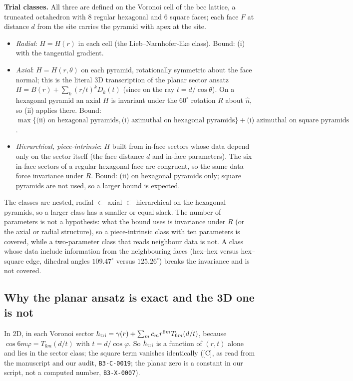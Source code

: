 \documentclass[10pt]{article}
\newcommand{\tier}[1]{\textsf{[#1]}}
\newcommand{\cid}[1]{\texttt{B3-#1}}
\theoremstyle{remark}
\begin{document}
\textbf{Trial classes.} All three are defined on the Voronoi cell of the bcc lattice, a truncated octahedron with 8 regular hexagonal and 6 square faces; each face $F$ at distance $d$ from the site carries the pyramid with apex at the site.
\begin{itemize}
\item \emph{Radial}: $H=H(r)$ in each cell (the Lieb--Narnhofer-like class). Bound: (i) with the tangential gradient.
\item \emph{Axial}: $H=H(r,\theta)$ on each pyramid, rotationally symmetric about the face normal; this is the literal 3D transcription of the planar sector ansatz $H=B(r)+\sum_k(r/t)^kD_k(t)$ (since on the ray $t=d/\cos\theta$). On a hexagonal pyramid an axial $H$ is invariant under the $60^\circ$ rotation $R$ about $\hat n$, so (ii) applies there. Bound: $\max\{\text{(ii) on hexagonal pyramids},\text{(i) azimuthal on hexagonal pyramids}\}+\text{(i) azimuthal on square pyramids}$.
\item \emph{Hierarchical, piece-intrinsic}: $H$ built from in-face sectors whose data depend only on the sector itself (the face distance $d$ and in-face parameters). The six in-face sectors of a regular hexagonal face are congruent, so the same data force invariance under $R$. Bound: (ii) on hexagonal pyramids only; square pyramids are not used, so a larger bound is expected.
\end{itemize}
The classes are nested, radial $\subset$ axial $\subset$ hierarchical on the hexagonal pyramids, so a larger class has a smaller or equal slack.
The number of parameters is not a hypothesis: what the bound uses is invariance under $R$ (or the axial or radial structure), so a piece-intrinsic class with ten parameters is covered, while a two-parameter class that reads neighbour data is not. A class whose data
include information from the neighbouring faces (hex--hex versus hex--square edge, dihedral angles $109.47^\circ$ versus $125.26^\circ$) breaks the invariance and is not covered.

\subsection{Why the planar ansatz is exact and the 3D one is not}
In 2D, in each Voronoi sector $h_{\rm tri}=\gamma(r)+\sum_mc_mr^{6m}T_{6m}(d/t)$, because $\cos 6m\varphi=T_{6m}(d/t)$ with $t=d/\cos\varphi$.
So $h_{\rm tri}$ is a function of $(r,t)$ alone and lies in the sector class; the square term vanishes identically
(\tier{C}, as read from the manuscript and our audit, \cid{C-0019}; the planar zero is a constant in our script, not a computed number, \cid{X-0007}).
\end{document}
